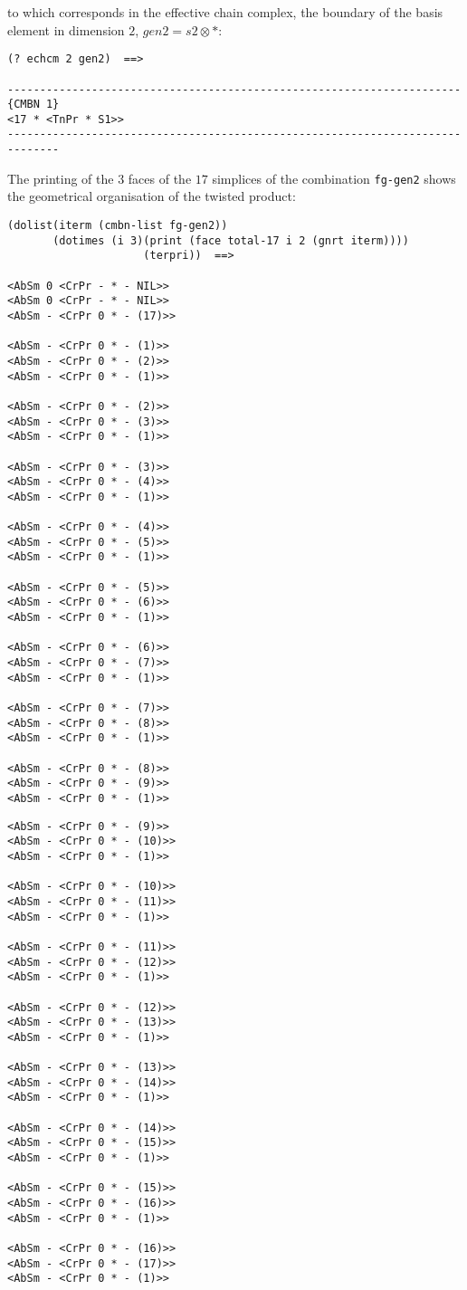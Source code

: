 to which corresponds in the effective chain complex, the boundary of the basis
element in dimension $2$, $gen2=s2 \otimes *$:
{\footnotesize\begin{verbatim}
(? echcm 2 gen2)  ==>

----------------------------------------------------------------------{CMBN 1}
<17 * <TnPr * S1>>
------------------------------------------------------------------------------
\end{verbatim}}
The printing of the $3$ faces of the $17$ simplices of the combination
{\tt fg-gen2} shows the geometrical organisation of the twisted product:
{\footnotesize\begin{verbatim}
(dolist(iterm (cmbn-list fg-gen2))
       (dotimes (i 3)(print (face total-17 i 2 (gnrt iterm)))) 
                     (terpri))  ==>

<AbSm 0 <CrPr - * - NIL>> 
<AbSm 0 <CrPr - * - NIL>> 
<AbSm - <CrPr 0 * - (17)>> 

<AbSm - <CrPr 0 * - (1)>> 
<AbSm - <CrPr 0 * - (2)>> 
<AbSm - <CrPr 0 * - (1)>> 

<AbSm - <CrPr 0 * - (2)>> 
<AbSm - <CrPr 0 * - (3)>> 
<AbSm - <CrPr 0 * - (1)>> 

<AbSm - <CrPr 0 * - (3)>> 
<AbSm - <CrPr 0 * - (4)>> 
<AbSm - <CrPr 0 * - (1)>> 

<AbSm - <CrPr 0 * - (4)>> 
<AbSm - <CrPr 0 * - (5)>> 
<AbSm - <CrPr 0 * - (1)>> 

<AbSm - <CrPr 0 * - (5)>> 
<AbSm - <CrPr 0 * - (6)>> 
<AbSm - <CrPr 0 * - (1)>> 

<AbSm - <CrPr 0 * - (6)>> 
<AbSm - <CrPr 0 * - (7)>> 
<AbSm - <CrPr 0 * - (1)>> 

<AbSm - <CrPr 0 * - (7)>> 
<AbSm - <CrPr 0 * - (8)>> 
<AbSm - <CrPr 0 * - (1)>> 

<AbSm - <CrPr 0 * - (8)>> 
<AbSm - <CrPr 0 * - (9)>> 
<AbSm - <CrPr 0 * - (1)>> 
\end{verbatim}}
\newpage
{\footnotesize\begin{verbatim}
<AbSm - <CrPr 0 * - (9)>> 
<AbSm - <CrPr 0 * - (10)>> 
<AbSm - <CrPr 0 * - (1)>> 

<AbSm - <CrPr 0 * - (10)>> 
<AbSm - <CrPr 0 * - (11)>> 
<AbSm - <CrPr 0 * - (1)>> 

<AbSm - <CrPr 0 * - (11)>> 
<AbSm - <CrPr 0 * - (12)>> 
<AbSm - <CrPr 0 * - (1)>> 

<AbSm - <CrPr 0 * - (12)>> 
<AbSm - <CrPr 0 * - (13)>> 
<AbSm - <CrPr 0 * - (1)>> 

<AbSm - <CrPr 0 * - (13)>> 
<AbSm - <CrPr 0 * - (14)>> 
<AbSm - <CrPr 0 * - (1)>> 

<AbSm - <CrPr 0 * - (14)>> 
<AbSm - <CrPr 0 * - (15)>> 
<AbSm - <CrPr 0 * - (1)>> 

<AbSm - <CrPr 0 * - (15)>> 
<AbSm - <CrPr 0 * - (16)>> 
<AbSm - <CrPr 0 * - (1)>> 

<AbSm - <CrPr 0 * - (16)>> 
<AbSm - <CrPr 0 * - (17)>> 
<AbSm - <CrPr 0 * - (1)>> 
\end{verbatim}}
